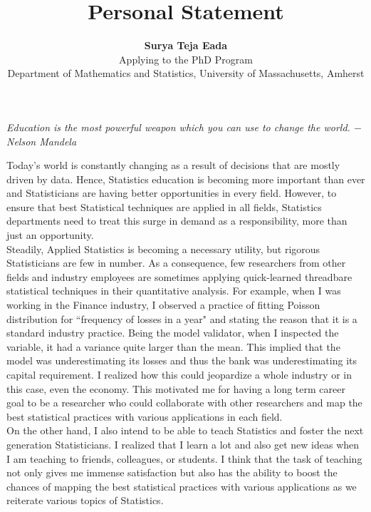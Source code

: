 \documentclass[12pt]{article}
\begin{document}
\title{Personal Statement}
\author{{\bf Surya Teja Eada} \\  {\small Applying to the PhD Program } \\ {\small Department of Mathematics and Statistics, University of Massachusetts, Amherst } }
\maketitle

\begin{flushcenter}

{\it Education is the most powerful weapon which you can use to change the world. $-$ Nelson Mandela}
\\
\end{flushcenter}

Today's world is constantly changing as a result of decisions that are mostly driven by data. Hence, Statistics education is becoming more important than ever and Statisticians are having better opportunities in every field. However, to ensure that best Statistical techniques are applied in all fields, Statistics departments need to treat this surge in demand as a responsibility, more than just an opportunity. \\

Steadily, Applied Statistics is becoming a necessary utility, but rigorous Statisticians are few in number. As a consequence, few researchers from other fields and industry employees are sometimes applying quick-learned threadbare statistical techniques in their quantitative analysis. For example, when I was working in the Finance industry, I observed a practice of fitting Poisson distribution for ``frequency of losses in a year" and stating the reason that it is a standard industry practice. Being the model validator, when I inspected the variable, it had a variance quite larger than the mean. This implied that the model was underestimating its losses and thus the bank was underestimating its capital requirement. I realized how this could jeopardize a whole industry or in this case, even the economy. This motivated me for having a long term career goal to be a researcher who could collaborate with other researchers and map the best statistical practices with various applications in each field. \\

On the other hand, I also intend to be able to teach Statistics and foster the next generation Statisticians. I realized that I learn a lot and also get new ideas when I am teaching to friends, colleagues, or students. I think that the task of teaching not only gives me immense satisfaction but also has the ability to boost the chances of mapping the best statistical practices with various applications as we reiterate various topics of Statistics. \\ 
\end{document}
